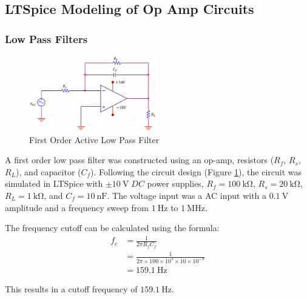 \documentclass[12pt]{article}
\begin{document}
\subsection{LTSpice Modeling of Op Amp Circuits}
\subsubsection{Low Pass Filters}
\begin{figure}[H]
  \centering
  \includegraphics[width=0.5\textwidth]{photos/First Order Active Low Pass Filter.png}
  \caption{First Order Active Low Pass Filter}
  \label{fig:FirstOrderActiveLowPassFilter}
\end{figure}

A first order low pass filter was constructed using an op-amp, resistors
($R_f$, $R_s$, $R_L$), and capacitor ($C_f$). Following the circuit design
(Figure \ref{fig:FirstOrderActiveLowPassFilter}), the circuit was simulated in LTSpice
with $\pm \SI{10}{\volt} \; DC$ power supplies, $R_f = \SI{100}{\kilo\ohm}$, $R_s = \SI{20}{\kilo\ohm}$,
$R_L = \SI{1}{\kilo\ohm}$, and $C_f = \SI{10}{\nano\farad}$. The voltage input was a
AC input with a $\SI{0.1}{\volt}$ amplitude and a frequency sweep from $\SI{1}{\hertz}$
to $\SI{1}{\mega\hertz}$.
\newline

The frequency cutoff can be calculated using the formula:
\[
  \begin{aligned}
    f_c & = \frac{1}{2\pi R_f C_f}                                         \\
    & = \frac{1}{2\pi \times 100 \times 10^3 \times 10 \times 10^{-9}} \\
    & = \SI{159.1}{\hertz}
  \end{aligned}
\]

This results in a cutoff frequency of $\SI{159.1}{\hertz}$.
\end{document}

